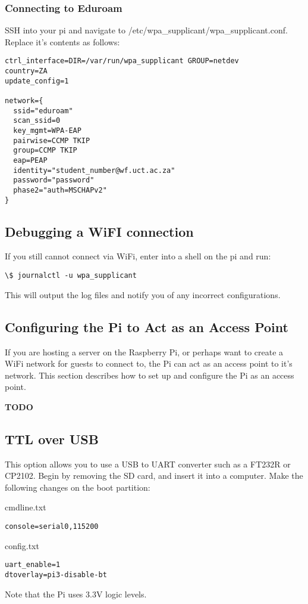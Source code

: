 \subsubsection{Connecting to Eduroam}
SSH into your pi and navigate to /etc/wpa\_supplicant/wpa\_supplicant.conf. Replace it's contents as follows:

\begin{verbatim}
ctrl_interface=DIR=/var/run/wpa_supplicant GROUP=netdev
country=ZA
update_config=1

network={
  ssid="eduroam"
  scan_ssid=0
  key_mgmt=WPA-EAP
  pairwise=CCMP TKIP
  group=CCMP TKIP
  eap=PEAP
  identity="student_number@wf.uct.ac.za"
  password="password"
  phase2="auth=MSCHAPv2"              
}  
\end{verbatim}

\subsection{Debugging a WiFI connection}
If you still cannot connect via WiFi, enter into a shell on the pi and run:
\begin{verbatim}
\$ journalctl -u wpa_supplicant
\end{verbatim}

This will output the log files and notify you of any incorrect configurations.

\subsection{Configuring the Pi to Act as an Access Point}
If you are hosting a server on the Raspberry Pi, or perhaps want to create a WiFi network for guests to connect to, the Pi can act as an access point to it's network. This section describes how to set up and configure the Pi as an access point.

\textbf{TODO}

\subsection{TTL over USB}
This option allows you to use a USB to UART converter such as a FT232R or CP2102.
Begin by removing the SD card, and insert it into a computer. Make the following changes on the boot partition:

cmdline.txt
\begin{verbatim}
console=serial0,115200 
\end{verbatim}


config.txt
\begin{verbatim}
uart_enable=1
dtoverlay=pi3-disable-bt
\end{verbatim}

Note that the Pi uses 3.3V logic levels. 


